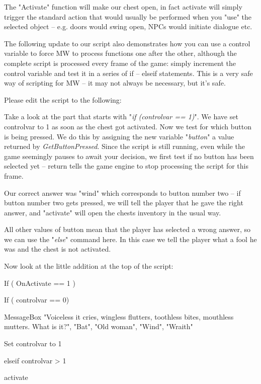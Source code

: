 \documentclass[
]{article}
\begin{document}
The "Activate" function will make our chest open, in fact activate will
simply trigger the standard action that would usually be performed when
you "use" the selected object -- e.g. doors would swing open, NPCs would
initiate dialogue etc.

The following update to our script also demonstrates how you can use a
control variable to force MW to process functions one after the other,
although the complete script is processed every frame of the game:
simply increment the control variable and test it in a series of if --
elseif statements. This is a very safe way of scripting for MW -- it may
not always be necessary, but it's safe.

Please edit the script to the following:



Take a look at the part that starts with "\emph{if (controlvar == 1)}".
We have set controlvar to 1 as soon as the chest got activated. Now we
test for which button is being pressed. We do this by assigning the new
variable "\emph{button}" a value returned by \emph{GetButtonPressed}.
Since the script is still running, even while the game seemingly pauses
to await your decision, we first test if no button has been selected yet
-- return tells the game engine to stop processing the script for this
frame.

Our correct answer was "wind" which corresponds to button number two --
if button number two gets pressed, we will tell the player that he gave
the right answer, and "activate" will open the chests inventory in the
usual way.

All other values of button mean that the player has selected a wrong
answer, so we can use the "\emph{else}" command here. In this case we
tell the player what a fool he was and the chest is not activated.

Now look at the little addition at the top of the script:


If ( OnActivate == 1 )

If ( controlvar == 0)

MessageBox "Voiceless it cries, wingless flutters, toothless bites,
mouthless mutters. What is it?", "Bat", "Old woman", "Wind", "Wraith"

Set controlvar to 1

elseif controlvar \textgreater{} 1

activate
\end{document}
